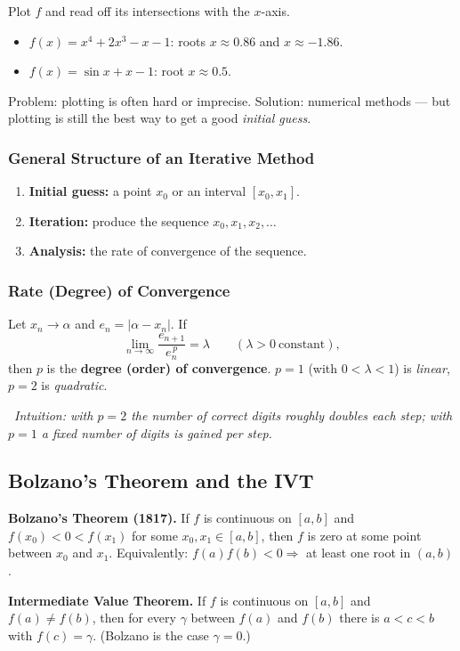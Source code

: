 \documentclass[hidelinks]{article}
\newcommand{\callout}[1]{\par\smallskip\noindent{\color{capri}$\blacktriangleright$}\ \textit{#1}\par\smallskip}
\newcommand{\abs}[1]{\left|#1\right|}
\begin{document}
Plot $f$ and read off its intersections with the $x$-axis.
\begin{itemize}
    \item $f(x)=x^4+2x^3-x-1$: roots $x\approx0.86$ and $x\approx-1.86$.
    \item $f(x)=\sin x+x-1$: root $x\approx0.5$.
\end{itemize}
Problem: plotting is often hard or imprecise. Solution: numerical methods --- but plotting is still the best way to get a good \emph{initial guess}.

\subsubsection{General Structure of an Iterative Method}

\begin{enumerate}
    \item \textbf{Initial guess:} a point $x_0$ or an interval $[x_0,x_1]$.
    \item \textbf{Iteration:} produce the sequence $x_0,x_1,x_2,\dots$
    \item \textbf{Analysis:} the rate of convergence of the sequence.
\end{enumerate}

\subsubsection{Rate (Degree) of Convergence}

Let $x_n\to\alpha$ and $e_n=\abs{\alpha-x_n}$. If
\[
\lim_{n\to\infty}\frac{e_{n+1}}{e_n^{\,p}}=\lambda\qquad(\lambda>0\ \text{constant}),
\]
then $p$ is the \textbf{degree (order) of convergence}. $p=1$ (with $0<\lambda<1$) is \emph{linear}, $p=2$ is \emph{quadratic}.

\callout{Intuition: with $p=2$ the number of correct digits roughly \emph{doubles} each step; with $p=1$ a fixed number of digits is gained per step.}

\subsection{Bolzano's Theorem and the IVT}

\textbf{Bolzano's Theorem (1817).} If $f$ is continuous on $[a,b]$ and $f(x_0)<0<f(x_1)$ for some $x_0,x_1\in[a,b]$, then $f$ is zero at some point between $x_0$ and $x_1$. Equivalently: $f(a)f(b)<0\Rightarrow$ at least one root in $(a,b)$.

\textbf{Intermediate Value Theorem.} If $f$ is continuous on $[a,b]$ and $f(a)\ne f(b)$, then for every $\gamma$ between $f(a)$ and $f(b)$ there is $a<c<b$ with $f(c)=\gamma$. (Bolzano is the case $\gamma=0$.)
\end{document}
